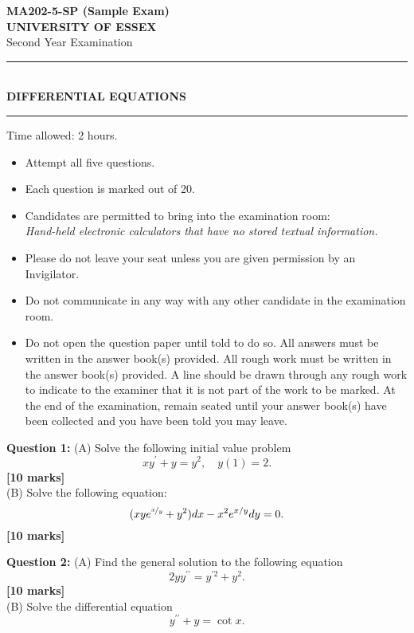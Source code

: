 \documentclass[11pt,a4paper]{article}
\begin{document}
	\thispagestyle{empty}
	\begin{singlespace}
		\hfill\textbf{\large MA202-5-SP (Sample Exam)}\\
		\textbf{\large UNIVERSITY OF ESSEX}\\[1.5cm]
		Second Year Examination\\
		\rule{\linewidth}{0.4pt}\\
		\textbf{\large DIFFERENTIAL EQUATIONS}\\
		\rule[0.66\baselineskip]{\linewidth}{0.4pt}
	\end{singlespace}
	\vspace{1cm}
	Time allowed: 2 hours.
	\vspace{1cm}
	\begin{itemize}
		\item Attempt all five questions.
		\item Each question is marked out of 20.
		\item Candidates are permitted to bring into the examination room:\\
		\textit{Hand-held electronic calculators that have no stored textual information.}
		\item Please do not leave your seat unless you are given permission by an Invigilator.
		\item Do not communicate in any way with any other candidate in the examination room.
		\item Do not open the question paper until told to do so. All answers must be written in the answer book(s) provided. All rough work must be written in the answer book(s) provided. A line should be drawn through any rough work to indicate to the examiner that it is not part of the work to be marked. At the end of the examination, remain
		seated until your answer book(s) have been collected and you have been told you may leave.
	\end{itemize}
	\newpage
	\setcounter{page}{1}
	\textbf{Question 1:} (A) Solve the following initial value problem
	$$
	xy^\prime + y = y^2,\quad y(1) = 2.
	$$
	\hfill\textbf{[10 marks]}\\
	(B) Solve the following equation:
	$$
	(xye^{\nicefrac{x}{y}}+y^2)dx - x^2e^{x/y}dy = 0.
	$$
	\hfill\textbf{[10 marks]}\par
	\textbf{Question 2:} (A) Find the general solution to the following equation
	$$
	2yy^{\prime\prime} = y^{\prime 2} + y^2.
	$$
	\hfill\textbf{[10 marks]}\\
	(B) Solve the differential equation
	$$
	y^{\prime\prime} + y = \cot x.
	$$
\end{document}
